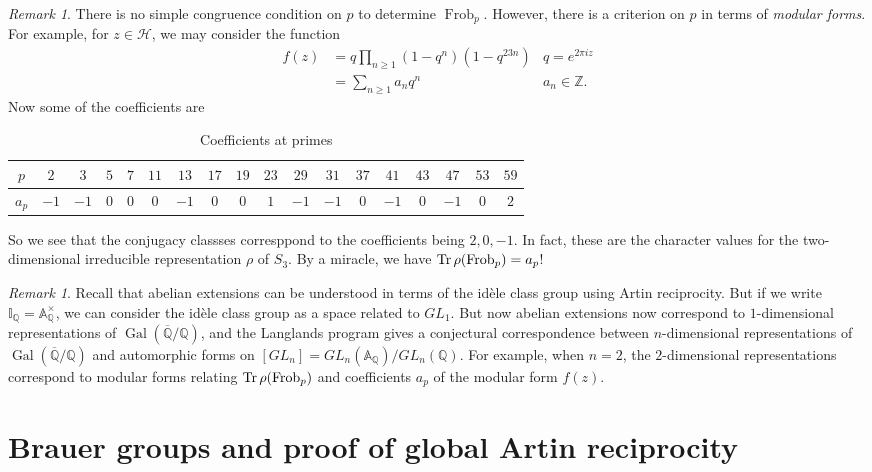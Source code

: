 \documentclass[leqno, openany]{memoir}
\theoremstyle{definition}
\theoremstyle{remark}
\newtheorem{rmk}[thm]{Remark}
\theoremstyle{plain}
\theoremstyle{definition}
\theoremstyle{remark}
\newcommand{\A}{\mathbb{A}}
\newcommand{\Z}{\mathbb{Z}}
\newcommand{\Q}{\mathbb{Q}}
\newcommand{\I}{\mathbb{I}}
\newcommand{\mc}[1]{\mathcal{#1}}
\newcommand{\ol}[1]{\overline{#1}}
\DeclareMathOperator{\Gal}{Gal}
\DeclareMathOperator{\Frob}{Frob}
\begin{document}
\begin{rmk}
    There is no simple congruence condition on $p$ to determine $\Frob_p$. However, there is a criterion on $p$ in terms of \textit{modular forms}. For example, for $z \in \mc{H}$, we may consider the function
    \begin{align*}
        f(z) &= q \prod_{n \geq 1} (1-q^n) (1-q^{23 n}) &q = e^{2 \pi i z} \\
             &= \sum_{n \geq 1} a_n q^n &a_n \in \Z.
    \end{align*}
    Now some of the coefficients are
    \begin{table}[H]
        \centering
        \caption{Coefficients at primes}
        \label{tab:label}
        \begin{tabular}{cccccccccccccccccc}
            \toprule
            $p$ & $2$ & $3$ & $5$ & $7$ & $11$ & $13$ & $17$ & $19$ & $23$ & $29$ & $31$ & $37$ & $41$ & $43$ & $47$ & $53$ & $59$ \\
            \midrule
            $a_p$ & $-1$ & $-1$ & $0$ & $0$ & $0$ & $-1$ & $0$ & $0$ & $1$ & $-1$ & $-1$ & $0$ & $-1$ & $0$ & $-1$ & $0$ & $2$ \\
            \bottomrule
        \end{tabular}
    \end{table}
    So we see that the conjugacy classses corresppond to the coefficients being $2, 0, -1$. In fact, these are the character values for the two-dimensional irreducible representation $\rho$ of $S_3$. By a miracle, we have $\Tr \rho(\Frob_p) = a_p$!
\end{rmk}

\begin{rmk}
    Recall that abelian extensions can be understood in terms of the id\`ele class group using Artin reciprocity. But if we write $\I_{\Q} = \A_{\Q}^{\times}$, we can consider the id\`ele class group as a space related to $GL_1$. But now abelian extensions now correspond to $1$-dimensional representations of $\Gal(\ol{\Q}/\Q)$, and the Langlands program gives a conjectural correspondence between $n$-dimensional representations of $\Gal(\ol{\Q}/\Q)$ and automorphic forms on $[GL_n] = GL_n(\A_{\Q}) / GL_n(\Q)$. For example, when $n=2$, the $2$-dimensional representations correspond to modular forms relating $\Tr \rho(\Frob_p)$ and coefficients $a_p$ of the modular form $f(z)$.
\end{rmk}

\section{Brauer groups and proof of global Artin reciprocity}%
\label{sec:brauer_groups_and_proof_of_artin_reciprocity}
\end{document}
